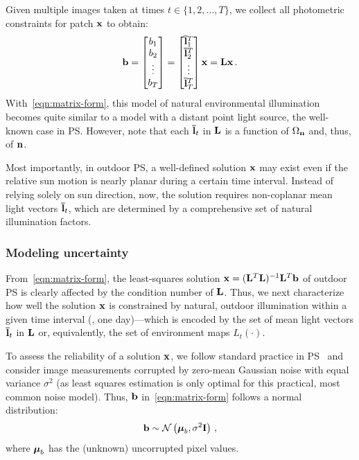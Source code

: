 Given multiple images taken at times $t \in \{1,2,\ldots,T\}$, we collect all photometric constraints for patch ${\bf x}$ to obtain:
\begin{equation}
\mathbf{b} =
\begin{bmatrix}
 b_1 \\ b_2 \\ \vdots \\ b_T
\end{bmatrix}
=
\begin{bmatrix}
 {\bf \bar l}_1^T \\ {\bf \bar l}_2^T \\ \vdots \\ {\bf \bar l}_T^T
\end{bmatrix}
{\bf x} = \mathbf{L} \mathbf{x} \,.
\label{eqn:matrix-form}
\end{equation}
With~\eqref{eqn:matrix-form}, this model of natural environmental illumination becomes quite similar to a model with a distant point light source, the well-known case in PS. However, note that each ${\bf \bar l}_t$ in ${\bf L}$ is a function of $\Omega_{\bf n}$ and, thus, of ${\bf n}$.

Most importantly, in outdoor PS, a well-defined solution ${\bf x}$ may exist even if the relative sun motion is nearly planar during a certain time interval. Instead of relying solely on sun direction, now, the solution requires non-coplanar mean light vectors ${\bf \bar l}_t$, which are determined by a comprehensive set of natural illumination factors.

\subsubsection{Modeling uncertainty}

From~\eqref{eqn:matrix-form}, the least-squares solution ${\bf x} = ({\bf L}^T{\bf L})^{-1}{\bf L}^T{\bf b}$ of outdoor PS is clearly affected by the condition number of ${\bf L}$. Thus, we next characterize how well the solution ${\bf x}$ is constrained by natural, outdoor illumination within a given time interval (\eg, one day)---which is encoded by the set of mean light vectors ${\bf \bar l}_t$ in ${\bf L}$ or, equivalently, the set of environment maps $L_t(\cdot)$.

To assess the reliability of a solution ${\bf x}$, we follow standard practice in PS~\cite{klaudiny-prl-14,sun-ivc-07} and consider image measurements corrupted by zero-mean Gaussian noise with equal variance $\sigma^2$ (as least squares estimation is only optimal for this practical, most common noise model). Thus, ${\bf b}$ in~\eqref{eqn:matrix-form} follows a normal distribution:
%
\begin{equation}
{\bf b} \sim \mathcal{N}\left( \boldsymbol \mu_b, \sigma^2 {\bf I} \right)\,,
\end{equation}
%
where $\boldsymbol \mu_b$ has the (unknown) uncorrupted pixel values.

